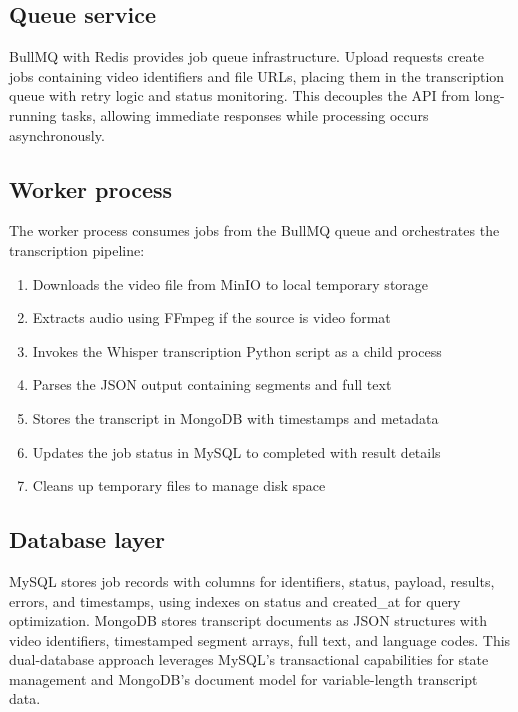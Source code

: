 \subsection{Queue service}
BullMQ with Redis provides job queue infrastructure. Upload requests create jobs containing video identifiers and file URLs, placing them in the transcription queue with retry logic and status monitoring. This decouples the API from long-running tasks, allowing immediate responses while processing occurs asynchronously.

\subsection{Worker process}
The worker process consumes jobs from the BullMQ queue and orchestrates the transcription pipeline:
\begin{enumerate}
    \item Downloads the video file from MinIO to local temporary storage
    \item Extracts audio using FFmpeg if the source is video format
    \item Invokes the Whisper transcription Python script as a child process
    \item Parses the JSON output containing segments and full text
    \item Stores the transcript in MongoDB with timestamps and metadata
    \item Updates the job status in MySQL to completed with result details
    \item Cleans up temporary files to manage disk space
\end{enumerate}

\subsection{Database layer}
MySQL stores job records with columns for identifiers, status, payload, results, errors, and timestamps, using indexes on status and created\_at for query optimization. MongoDB stores transcript documents as JSON structures with video identifiers, timestamped segment arrays, full text, and language codes. This dual-database approach leverages MySQL's transactional capabilities for state management and MongoDB's document model for variable-length transcript data.
